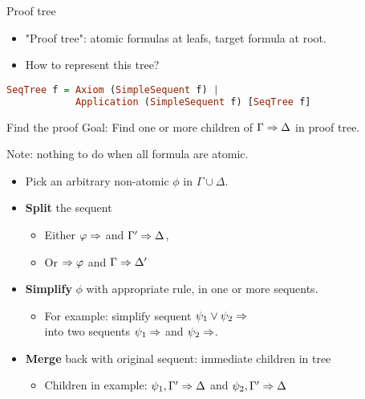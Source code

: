 \documentclass{beamer}
\begin{document}
\begin{frame}[fragile]{Proof tree}
\begin{itemize}
	\item "Proof tree": atomic formulas at leafs, target formula at root.
	\item How to represent this tree?
\end{itemize}

	\vspace{1em}
	\begin{lstlisting}[language=haskell]
SeqTree f = Axiom (SimpleSequent f) |
            Application (SimpleSequent f) [SeqTree f]
\end{lstlisting}
\end{frame}

\begin{frame}{Find the proof}
	Goal: Find one or more children of $\Gamma\Rightarrow\Delta$ in proof tree.
	\pause

	\vspace{1em}
	Note: nothing to do when all formula are atomic.
	\vspace{1em}


	\begin{itemize}
		\item Pick an arbitrary non-atomic $\phi$ in $\Gamma \cup \Delta$.
		\item \textbf{Split} the sequent
		\begin{itemize}
			\item Either $\varphi\Rightarrow$ and $\Gamma'\Rightarrow\Delta$, \\
		    \item Or $\Rightarrow\varphi$ and $\Gamma\Rightarrow\Delta'$
		\end{itemize}
		\pause
		\item\textbf{Simplify} $\phi$ with appropriate rule, in one or more sequents.
		\begin{itemize}
			\item For example: simplify sequent $\psi_1 \lor \psi_2\Rightarrow$ \\  into two sequents $\psi_1\Rightarrow$ and $\psi_2\Rightarrow$.
		\end{itemize}
		\item \textbf{Merge} back with original sequent: immediate children in tree
		\begin{itemize}
			\item Children in example: $\psi_1, \Gamma'\Rightarrow\Delta$ and $\psi_2, \Gamma'\Rightarrow\Delta$
		\end{itemize}
	\end{itemize}
\end{frame}
\end{document}

